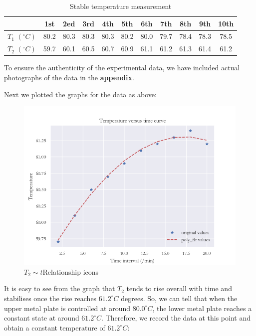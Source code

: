 \documentclass[UTF8]{article}
\begin{document}
    \begin{table}[H]
    	\centering
    	\begin{tabular}{ccccccccccc}
    		\toprule
    		& 1st & 2ed & 3rd & 4th & 5th & 6th & 7th &8th & 9th & 10th \\
    		\midrule
    		$T_{1}$ $\left ( ^{\circ} C \right ) $ & 80.2 & 80.3 & 80.3 & 80.3 & 80.2 & 80.0 & 79.7 & 78.4 & 78.3 & 78.5\\
    		$T_{2}$ $\left ( ^{\circ} C \right ) $ & 59.7 & 60.1 & 60.5 & 60.7 & 60.9 & 61.1 & 61.2 & 61.3 & 61.4 & 61.2\\
    		\bottomrule
    	\end{tabular}
    	\caption{Stable temperature measurement}
    	\label{table.2}
    \end{table}
    
    To ensure the authenticity of the experimental data, we have included actual photographs of the data in the \textbf{appendix}.
    
    Next we plotted the graphs for the data as above:
     \begin{figure}[H]
    	\centering
    	\includegraphics[clip,scale=0.8]{fig/fig12.png}
    	\caption{$T_{2} \sim t$Relationship icons}
    	\label{figure.11}
    \end{figure}
    
    It is easy to see from the graph that $T_{2}$ tends to rise overall with time and stabilises once the rise reaches $61.2^{\circ} C$ degrees. So, we can tell that when the upper metal plate is controlled at around $80.0^{\circ} C$, the lower metal plate reaches a constant state at around $61.2^{\circ} C$. Therefore, we record the data at this point and obtain a constant temperature of $61.2^{\circ} C$:
    
\end{document}
